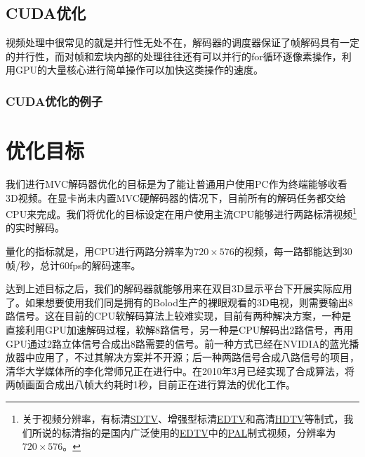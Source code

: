 \subsection{CUDA优化}
\label{subsec:cudaopt}

视频处理中很常见的就是并行性无处不在，解码器的调度器保证了帧解码具有一定的并行性，而对帧和宏块内部的处理往往还有可以并行的for循环逐像素操作，利用GPU的大量核心进行简单操作可以加快这类操作的速度。

\subsubsection{CUDA优化的例子}
\label{subsubsec:egcudaopt}

\section{优化目标}
\label{sec:optaim}

我们进行MVC解码器优化的目标是为了能让普通用户使用PC作为终端能够收看3D视频。在显卡尚未内置MVC硬解码器的情况下，目前所有的解码任务都交给CPU来完成。我们将优化的目标设定在用户使用主流CPU能够进行两路标清视频\footnote{关于视频分辨率，有标清\href{http://en.wikipedia.org/wiki/Standard-definition_television}{SDTV}、增强型标清\href{http://en.wikipedia.org/wiki/Enhanced-definition_television}{EDTV}和高清\href{http://en.wikipedia.org/wiki/High-definition_television}{HDTV}等制式，我们所说的标清指的是国内广泛使用的\href{http://en.wikipedia.org/wiki/Enhanced-definition_television}{EDTV}中的\href{http://en.wikipedia.org/wiki/Phase_Alternating_Line}{PAL}制式视频，分辨率为$720\times576$。}的实时解码。

量化的指标就是，用CPU进行两路分辨率为$720\times576$的视频，每一路都能达到30帧/秒，总计60fps的解码速率。

达到上述目标之后，我们的解码器就能够用来在双目3D显示平台下开展实际应用了。如果想要使用我们同是拥有的Bolod生产的裸眼观看的3D电视，则需要输出8路信号。这在目前的CPU软解码算法上较难实现，目前有两种解决方案，一种是直接利用GPU加速解码过程，软解8路信号，另一种是CPU解码出2路信号，再用GPU通过2路立体信号合成出8路需要的信号。前一种方式已经在NVIDIA的蓝光播放器中应用了，不过其解决方案并不开源；后一种两路信号合成八路信号的项目，清华大学媒体所的李化常师兄正在进行中。在2010年3月已经实现了合成算法，将两帧画面合成出八帧大约耗时1秒，目前正在进行算法的优化工作。